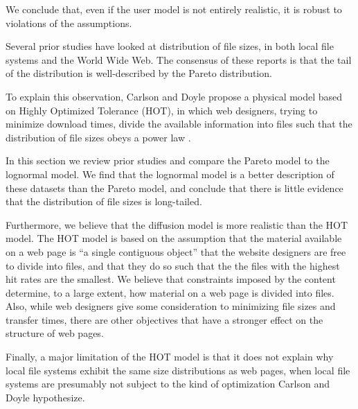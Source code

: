 \documentclass[10pt,twocolumn]{article}
\begin{document}
We conclude that, even if the user model is not entirely realistic,
it is robust to violations of the assumptions.




Several prior studies have looked at distribution of file sizes,
in both local file systems and the World Wide Web.  The consensus of
these reports is that the tail of the distribution is well-described
by the Pareto distribution.

To explain this observation, Carlson and
Doyle propose a physical model based on Highly Optimized Tolerance
(HOT), in which web designers, trying to minimize download times,
divide the available information into files such that the distribution
of file sizes obeys a power law \cite{CarlsonDoyle99}
\cite{ZhuYuDoyle01}.

In this section we review prior studies and compare the Pareto
model to the lognormal model.  We find that the lognormal
model is a better description of these datasets than the
Pareto model, and conclude that there is little evidence
that the distribution of file sizes is long-tailed.

Furthermore, we believe that the diffusion model is more realistic
than the HOT model.  The HOT model is based on the assumption that the
material available on a web page is ``a single contiguous object''
that the website designers are free to divide into files, and that
they do so such that the the files with the highest hit rates are the
smallest.  We believe that constraints imposed by the content
determine, to a large extent, how material on a web page is divided
into files.  Also, while web designers give some consideration to
minimizing file sizes and transfer times, there are other objectives
that have a stronger effect on the structure of web pages.

Finally, a major limitation of the HOT model is that it does not explain
why local file systems exhibit the same size distributions as web
pages, when local file systems are presumably not subject to the kind
of optimization Carlson and Doyle hypothesize.
\end{document}
